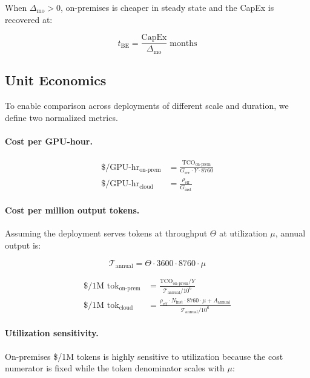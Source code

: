 \documentclass{article}
\begin{document}
When $\Delta_{\text{mo}} > 0$, on-premises is cheaper in steady state and
the CapEx is recovered at:

\begin{equation}
  t_{\text{BE}} = \frac{\text{CapEx}}{\Delta_{\text{mo}}} \;\text{months}
  \label{eq:breakeven}
\end{equation}

\subsection{Unit Economics}
\label{sec:unit_econ}

To enable comparison across deployments of different scale and duration, we
define two normalized metrics.

\paragraph{Cost per GPU-hour.}
\begin{align}
  \$/\text{GPU-hr}_{\text{on-prem}} &= \frac{\text{TCO}_{\text{on-prem}}}
    {G_{\text{rec}} \cdot Y \cdot 8760}
  \label{eq:gpu_hr_onprem} \\
  \$/\text{GPU-hr}_{\text{cloud}} &= \frac{\rho_{\text{eff}}}{G_{\text{inst}}}
  \label{eq:gpu_hr_cloud}
\end{align}

\paragraph{Cost per million output tokens.}
Assuming the deployment serves tokens at throughput $\Theta$ at utilization
$\mu$, annual output is:

\begin{equation}
  \mathcal{T}_{\text{annual}} = \Theta \cdot 3600 \cdot 8760 \cdot \mu
  \label{eq:annual_tokens}
\end{equation}

\begin{align}
  \$/\text{1M tok}_{\text{on-prem}} &= \frac{\text{TCO}_{\text{on-prem}} / Y}
    {\mathcal{T}_{\text{annual}} / 10^6}
  \label{eq:mtoken_onprem} \\
  \$/\text{1M tok}_{\text{cloud}} &= \frac{\rho_{\text{eff}} \cdot N_{\text{inst}}
    \cdot 8760 \cdot \mu + A_{\text{annual}}}
    {\mathcal{T}_{\text{annual}} / 10^6}
  \label{eq:mtoken_cloud}
\end{align}

\paragraph{Utilization sensitivity.}
On-premises \$/1M tokens is highly sensitive to utilization because the
cost numerator is fixed while the token denominator scales with $\mu$:
\end{document}
